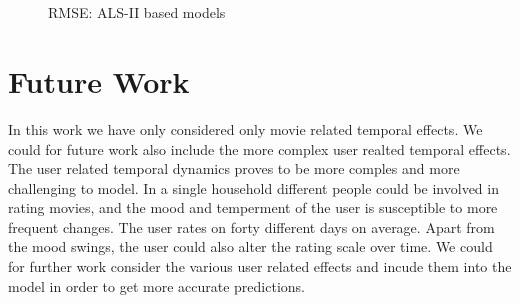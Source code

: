 \begin{figure}[h!]
{\label{fig:Model 1}
}
\\
\\
\label{fig:RMSE SVD}
\caption{RMSE: ALS-II based models}
\end{figure}


\section{Future Work}
In this work we have only considered only movie related temporal effects. We
could for future work also include the more complex user realted temporal
effects. The user related temporal dynamics proves to be more comples and more
challenging to model. In a single household different people could be involved
in rating movies, and the mood and temperment of the user is susceptible to more
frequent changes. The user rates on forty different days on average. Apart from
the mood swings, the user could also alter the rating scale over time. We could
for further work consider the various user related effects and incude them into
the model in order to get more accurate predictions. 

